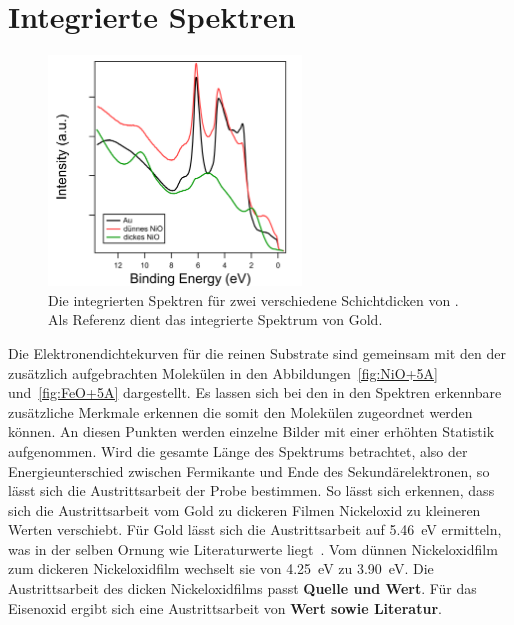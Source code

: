     \section{Integrierte Spektren}
    \label{sec:EDC}
        \begin{figure}
            \centering
            \includegraphics[width=0.6\textwidth]{./content/pictures/NiO_Filmdicke}
            \caption{Die integrierten Spektren für zwei verschiedene Schichtdicken von . Als Referenz dient das integrierte Spektrum von Gold.}
            \label{fig:NiO_Filmdicke}
        \end{figure}
        Die Elektronendichtekurven für die reinen Substrate sind gemeinsam mit den der zusätzlich aufgebrachten Molekülen in den Abbildungen~\ref{fig:NiO+5A} und~\ref{fig:FeO+5A} dargestellt.
        Es lassen sich bei den in den Spektren erkennbare zusätzliche Merkmale erkennen die somit den Molekülen zugeordnet werden können.
        An diesen Punkten werden einzelne Bilder mit einer erhöhten Statistik aufgenommen.
        Wird die gesamte Länge des Spektrums betrachtet, also der Energieunterschied zwischen Fermikante und Ende des Sekundärelektronen, so lässt sich die Austrittsarbeit der Probe bestimmen.
        So lässt sich erkennen, dass sich die Austrittsarbeit vom Gold zu dickeren Filmen Nickeloxid zu kleineren Werten verschiebt.
        Für Gold lässt sich die Austrittsarbeit auf \SI{5.46}{\electronvolt} ermitteln, was in der selben Ornung wie Literaturwerte liegt~\cite{Hüfner}.
        Vom dünnen Nickeloxidfilm zum dickeren Nickeloxidfilm wechselt sie von \SI{4.25}{\electronvolt} zu \SI{3.90}{\electronvolt}.
        Die Austrittsarbeit des dicken Nickeloxidfilms passt \textbf{Quelle und Wert}.
        Für das Eisenoxid ergibt sich eine Austrittsarbeit von \textbf{Wert sowie Literatur}.

